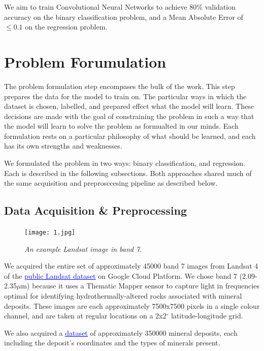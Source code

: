 \documentclass[10pt]{article}
\begin{document}
We aim to train Convolutional Neural Networks to achieve 80\% validation accuracy
on the binary classification problem, and a Mean Absolute Error of $\leq 0.1$
on the regression problem.

\section{Problem Forumulation}\label{sec:pf}

The problem formulation step encompases the bulk of the work. This step prepares
the data for the model to train on. The particular ways in which the dataset
is chosen, labelled, and prepared effect what the model will learn. These
decisions are made with the goal of constraining the problem in such a way that
the model will learn to solve the problem as formualted in our minds. Each
formulation rests on a particular philosophy of what should be learned, and each
has its own strengths and weaknesses.

We formulated the problem in two ways: binary classification, and regression. Each
is described in the following subsections. Both approaches shared much of the
same acquisition and preprosccesing pipeline as described below.

\subsection{Data Acquisition \& Preprocessing}

\begin{figure}
  \centering
  \texttt{[image: 1.jpg]}
  \caption{\textit{An example Landsat image in band 7.}}
  \label{fig:example_image}
\end{figure}

We acquired the entire set of approximately 45000 band 7 images from Landsat 4 of the
\href{https://console.cloud.google.com/marketplace/product/usgs-public-data/landast}{\textcolor{blue}{\underline{public Landsat dataset}}}
on Google Cloud Platform. We chose band 7 (2.09-2.35$\mu$m) because it uses a
Thematic Mapper sensor to capture light in frequencies optimal for identifying
hydrothermally-altered rocks associated with mineral deposits. These images are
each approximately 7500x7500 pixels in a single colour channel, and are taken
at regular locations on a 2x2$^\circ$ latitude-longitude grid.

We also acquired a \href{https://www.kaggle.com/datasets/thedevastator/mineral-ores-around-the-world}{\textcolor{blue}{\underline{dataset}}}
of approximately 350000 mineral deposits, each including the deposit's coordinates
and the types of minerals present. 
\end{document}
